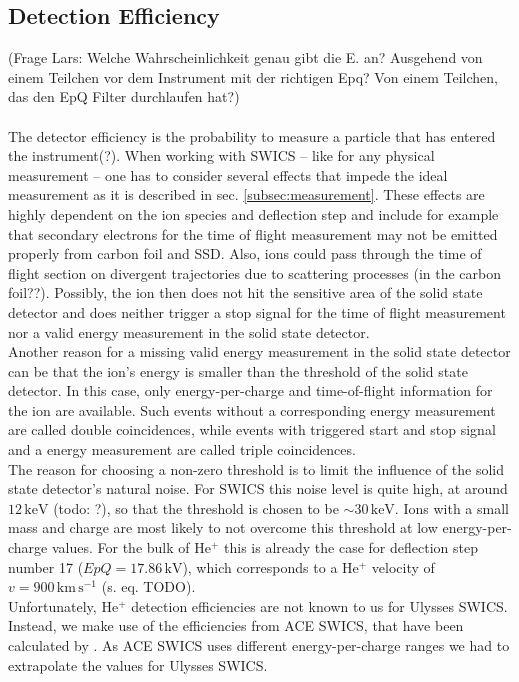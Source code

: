 \subsection{Detection Efficiency}
(Frage Lars: Welche Wahrscheinlichkeit genau gibt die E. an? Ausgehend von einem Teilchen vor dem Instrument mit der richtigen Epq? Von einem Teilchen, das den EpQ Filter durchlaufen hat?)\\ \\
The detector efficiency is the probability to measure a particle that has entered the instrument(?). 
When working with SWICS -- like for any physical measurement -- one has to consider several effects that impede the ideal measurement as it is described in sec. \ref{subsec:measurement}. 
These effects are highly dependent on the ion species and deflection step and include for example that secondary electrons for the time of flight measurement may not be emitted properly from carbon foil and SSD. Also, ions could pass through the time of flight section on divergent trajectories due to scattering processes (in the carbon foil??). Possibly, the ion then does not hit the sensitive area of the solid state detector and does neither trigger a stop signal for the time of flight measurement nor a valid energy measurement in the solid state detector.\\
Another reason for a missing valid energy measurement in the solid state detector can be that the ion's energy is smaller than the threshold of the solid state detector. In this case, only energy-per-charge and time-of-flight information for the ion are available. Such events without a corresponding energy measurement are called double coincidences, while events with triggered start and stop signal and a energy measurement are called triple coincidences.\\
The reason for choosing a non-zero threshold is to limit the influence of the solid state detector's natural noise. For SWICS this noise level is quite high, at around $12\,\mathrm{keV}$ \citep{gloeckler_1992} (todo: ?), so that the threshold is chosen to be $\sim 30 \, \mathrm{keV}$. Ions with a small mass and charge are most likely to not overcome this threshold at low energy-per-charge values. For the bulk of $\mathrm{He^{+}}$ this is already the case for deflection step number 17 ($EpQ = 17.86\,\mathrm{kV}$), which corresponds to a $\mathrm{He^{+}}$ velocity of $v = 900\,\mathrm{km\,s^{-1}}$ (s. eq. TODO).\\
Unfortunately, $\mathrm{He^{+}}$ detection efficiencies are not known to us for Ulysses SWICS. Instead, we make use of the efficiencies from ACE SWICS, that have been calculated by \citet{koeten}. As ACE SWICS uses different energy-per-charge ranges we had to extrapolate the values for Ulysses SWICS.
